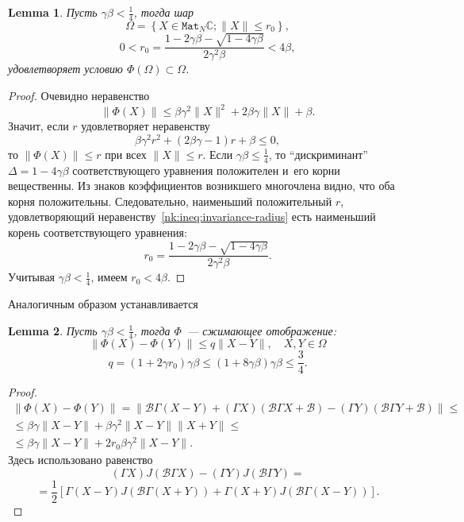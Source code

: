 \documentclass[14pt,a4paper]{extarticle}
\newtheorem{lem}{Lemma}
\theoremstyle{definition}
\begin{document}
\begin{lem}
    Пусть \( \gamma\beta < \frac14\),
    тогда шар
    \[
        \Omega = \left\{ X\in \mathtt{Mat}_N\mathbb{C}; \|X\| \leq r_0 \right\}, \]
    \[  0 < r_0 = \frac{1 - 2\gamma\beta - \sqrt{1-4\gamma\beta}}{2\gamma^2\beta} < 4\beta, \]
    удовлетворяет условию \( \Phi(\Omega)\subset\Omega \).
\end{lem}
\begin{proof}
Очевидно неравенство
    \[ \| \Phi(X) \| \leq
     \beta \gamma^2 \|X\|^2 + 2\beta\gamma\|X\| + \beta. \]
Значит, если \( r \) удовлетворяет неравенству
    \begin{equation}\label{nk:ineq:invariance-radius}
        \beta \gamma^2 r^2 + (2\beta\gamma - 1)r + \beta \leq 0,
    \end{equation}
    то \( \|\Phi(X)\| \leq r \) при всех \( \|X\| \leq r \).
Если \( \gamma\beta \leq \frac14 \),
    то ``дискриминант'' \( \Delta = 1-4\gamma\beta \)
    соответствующего уравнения положителен и~его корни вещественны.
Из знаков коэффициентов возникшего многочлена видно, что оба корня положительны.
Следовательно, наименьший положительный \( r \),
    удовлетворяющий неравенству~\eqref{nk:ineq:invariance-radius}
    есть наименьший корень
    соответствующего уравнения:
    \[ r_0 = \frac{1 - 2\gamma\beta - \sqrt{1-4\gamma\beta}}{2\gamma^2\beta}. \]
Учитывая \( \gamma\beta<\frac14 \), имеем \( r_0 < 4\beta \).
\end{proof}

Аналогичным образом устанавливается
\begin{lem}
    Пусть \(\gamma\beta<\frac14\),
    тогда \( \Phi \)~--- сжимающее отображение:
    \[ \| \Phi(X) - \Phi(Y) \| \leq q \|X - Y\|, \quad X,Y\in\Omega \]
    \[ q = (1+2\gamma r_0) \gamma\beta \leq (1+8\gamma\beta)\gamma\beta \leq \frac34. \]
\end{lem}
\begin{proof}
    \begin{align*} \| \Phi(X) - \Phi(Y) \| = \| \mathcal{B}\Gamma (X-Y) + (\Gamma X)(\mathcal{B}\Gamma X + \mathcal{B})
     - (\Gamma Y)(\mathcal{B} \Gamma Y + \mathcal{B}) \| \leq \\
        \leq
     \beta\gamma\|X-Y\| +
     \beta \gamma^2 \|X-Y\| \|X+Y\| \leq \\
        \leq
     \beta\gamma\|X-Y\| +
      2 r_0 \beta \gamma^2 \|X-Y\|.
    \end{align*}
Здесь использовано равенство
\[ (\Gamma X) J(\mathcal{B}\Gamma X) - (\Gamma Y) J(\mathcal{B}\Gamma Y) =
  \]
 \[= \frac12\left[
        \Gamma(X-Y) J(\mathcal{B}\Gamma(X+Y))
    +   \Gamma(X+Y) J(\mathcal{B}\Gamma(X-Y))
  \right].
\]
\end{proof}
\end{document}
